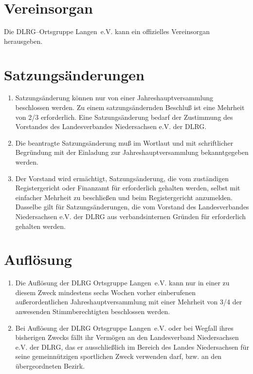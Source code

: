\documentclass[%
12pt, %
a4paper, %
headsepline, %
footsepline, %
parskip, %
headings=normal, %
]{scrartcl}
\begin{document}
\section{Vereinsorgan}
\label{sec:vereinsorgan}
Die DLRG--Ortsgruppe Langen~e.V. kann ein offizielles Vereinsorgan herausgeben.

\section{Satzungsänderungen}
\label{sec:satzungsaenderungen}
\begin{enumerate}
    \item Satzungsänderung können nur von einer Jahreshauptversammlung beschlossen werden. Zu einem satzungsändernden Beschluß ist eine Mehrheit von \num{2/3} erforderlich. Eine Satzungsänderung bedarf der Zustimmung des Vorstandes des Landesverbandes Niedersachsen e.V. der DLRG.
    \item Die beantragte Satzungsänderung muß im Wortlaut und mit schriftlicher Begründung mit der Einladung zur Jahreshauptversammlung bekanntgegeben werden.
    \item Der Vorstand wird ermächtigt, Satzungsänderung, die vom zuständigen Registergericht oder Finanzamt für erforderlich gehalten werden, selbst mit einfacher Mehrheit zu beschließen und beim Registergericht anzumelden. Dasselbe gilt für Satzungsänderungen, die vom Vorstand des Landesverbandes Niedersachsen e.V. der DLRG aus verbandsinternen Gründen für erforderlich gehalten werden.
\end{enumerate}

\section{Auflösung}
\label{sec:aufloesung}
\begin{enumerate}
    \item Die Auflösung der DLRG Ortsgruppe Langen~e.V. kann nur in einer zu diesem Zweck mindestens sechs Wochen vorher einberufenen außerordentlichen Jahreshauptversammlung mit einer Mehrheit von \num{3/4} der anwesenden Stimmberechtigten beschlossen werden.
    \item Bei Auflösung der DLRG Ortsgruppe Langen~e.V. oder bei Wegfall ihres bisherigen Zwecks fällt ihr Vermögen an den Landesverband Niedersachsen e.V. der DLRG, das er ausschließlich im Bereich des Landes Niedersachsen für seine gemeinnützigen sportlichen Zweck verwenden darf, bzw. an den übergeordneten Bezirk.
\end{enumerate}
\end{document}
